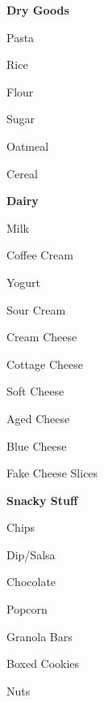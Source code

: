 \documentclass[12pt]{article}
\newcommand{\SmallSep}{\vspace{0.5em}}
\newcommand{\StoreSection}[1]
	{\Large\textbf{\color{Purple} #1}\par
	\SmallSep\normalsize}
\newcommand{\StoreItem}[1]
	{\textbf{\color{RoyalBlue} #1}}
\begin{document}
\StoreItem{Dry Goods}
\begin{multicols}{4}
\begin{compactitem}[\color{RoyalBlue}$\Box$]
	\item Pasta
	\item Rice
	\item Flour
	\item Sugar
    \item Oatmeal
    \item Cereal
	\item \underline{\hspace{3cm}}
	\item \underline{\hspace{3cm}}
\end{compactitem}
\end{multicols}

\StoreSection{Dairy}
\begin{multicols}{4}
\begin{compactitem}[\color{RoyalBlue}$\Box$]
	\item Milk
	\item Coffee Cream
	\item Yogurt
	\item Sour Cream
    \item Cream Cheese
    \item Cottage Cheese
    \item Soft Cheese
    \item Aged Cheese
    \item Blue Cheese
    \item Fake Cheese Slices
	\item \underline{\hspace{3cm}}
	\item \underline{\hspace{3cm}}
\end{compactitem}
\end{multicols}

\StoreSection{Snacky Stuff}
\begin{multicols}{4}
\begin{compactitem}[\color{RoyalBlue}$\Box$]
	\item Chips
	\item Dip/Salsa
	\item Chocolate
	\item Popcorn
    \item Granola Bars
    \item Boxed Cookies
    \item Nuts
    \item \underline{\hspace{3cm}}
	\item \underline{\hspace{3cm}}
\end{compactitem}
\end{multicols}
\end{document}
